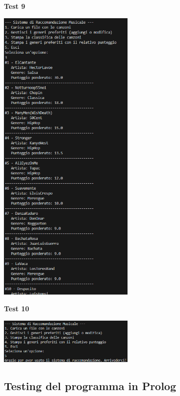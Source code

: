 \documentclass[a4paper,11pt]{article}
\begin{document}
\newpage
\begin{center}
    \textbf{Test 9}
    \par
    \vspace{0.5cm}
    \includegraphics[width=0.5\textwidth]{htest9}
\end{center}
\begin{center}
    \textbf{Test 10}
    \par
    \vspace{0.5cm}
    \includegraphics[width=0.5\textwidth]{htest10}
\end{center}
\vspace{1cm}

\newpage
\subsection{Testing del programma in Prolog}
\end{document}
